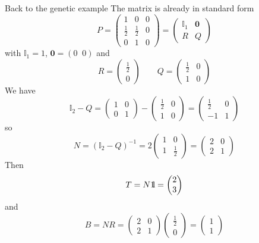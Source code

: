 \documentclass[aspectratio=43]{beamer}
\begin{document}
\begin{frame}{Back to the genetic example}
The matrix is already in standard form
\[
P=\left (
\begin{array}{ccc}
1 & 0 & 0 \\
\frac 12 & \frac 12 & 0 \\
0 & 1 & 0
\end{array}\right)
=\begin{pmatrix}
\mathbb{I}_1 & \mathbf{0} \\
R & Q
\end{pmatrix}
\]
with $\mathbb{I}_1=1$, $\mathbf{0}=(0\;\; 0)$ and
\[
R=\begin{pmatrix}
\frac 12\\ 0
\end{pmatrix}
\qquad
Q=\begin{pmatrix}
\frac 12 & 0\\
1 & 0
\end{pmatrix}
\]
We have
\[
\mathbb{I}_2-Q=\begin{pmatrix}
1 & 0 \\
0 & 1
\end{pmatrix}
-\begin{pmatrix}
\frac 12 & 0\\
1 & 0
\end{pmatrix}
=\begin{pmatrix}
\frac 12 & 0\\
-1 & 1
\end{pmatrix}
\]
so
\[
N=(\mathbb{I}_2-Q)^{-1}=
2\begin{pmatrix}
1 & 0 \\
1 & \frac 12
\end{pmatrix}=
\begin{pmatrix}
2 & 0 \\
2 & 1
\end{pmatrix}
\]
Then
\[
T=N\nbOne=\begin{pmatrix}
2\\
3
\end{pmatrix}
\]
and
\[
B=NR=
\begin{pmatrix}
2 & 0 \\
2 & 1
\end{pmatrix}
\begin{pmatrix}
\frac 12\\ 0
\end{pmatrix}
=
\begin{pmatrix}
1\\ 1
\end{pmatrix}
\]
\end{frame}
\end{document}

